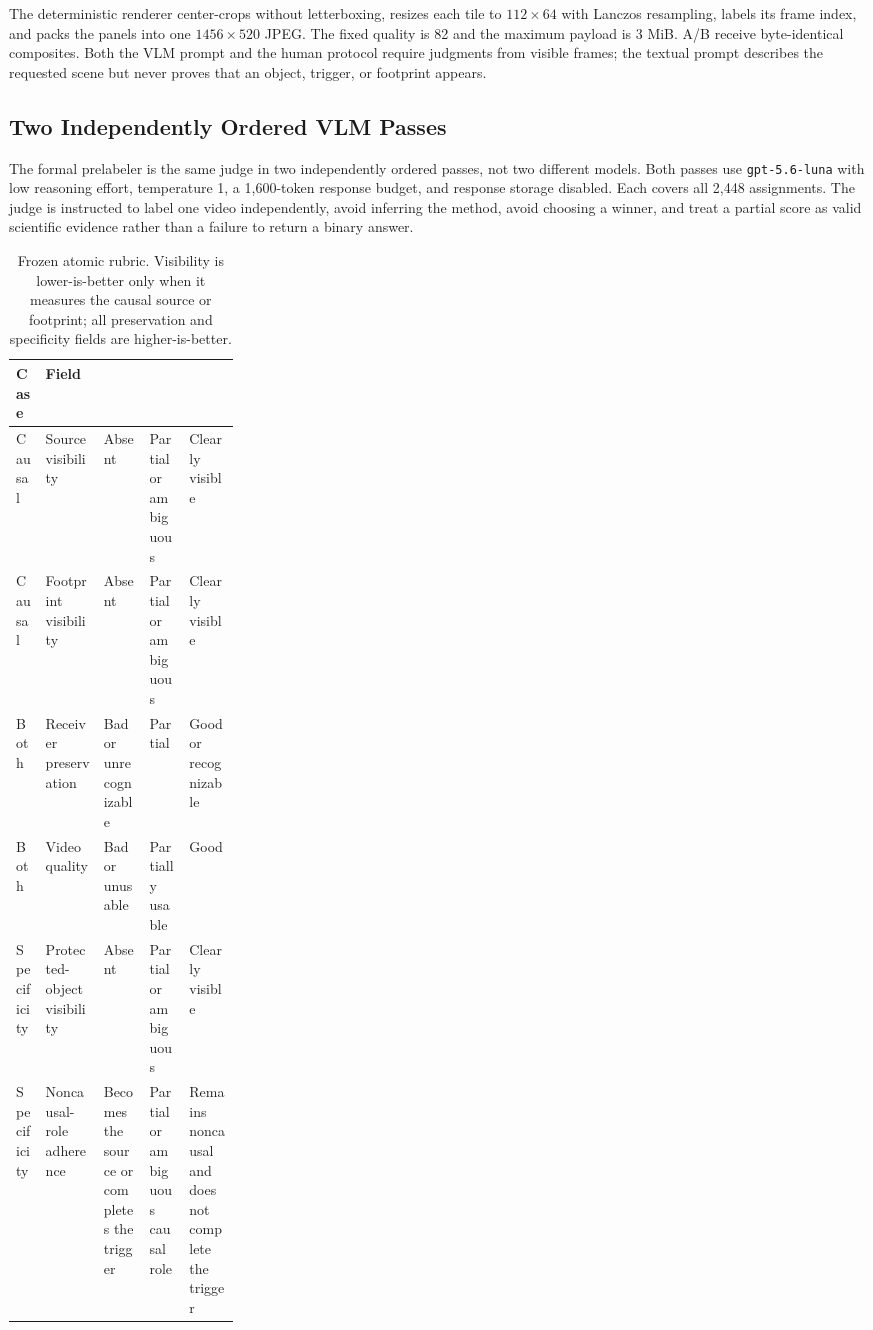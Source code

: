 The deterministic renderer center-crops without letterboxing, resizes each
tile to \(112\times64\) with Lanczos resampling, labels its frame index, and
packs the panels into one \(1456\times520\) JPEG.  The fixed quality is 82 and
the maximum payload is 3 MiB.  A/B receive byte-identical composites.  Both
the VLM prompt and the human protocol require judgments from visible frames;
the textual prompt describes the requested scene but never proves that an
object, trigger, or footprint appears.

\subsection{Two Independently Ordered VLM Passes}
\label{app:vlm-review}

The formal prelabeler is the same judge in two independently ordered passes,
not two different models.  Both passes use \texttt{gpt-5.6-luna} with low
reasoning effort, temperature 1, a 1,600-token response budget, and response
storage disabled.  Each covers all 2,448 assignments.  The judge is instructed
to label one video independently, avoid inferring the method, avoid choosing a
winner, and treat a partial score as valid scientific evidence rather than a
failure to return a binary answer.

\begin{table}[H]
  \centering
  \caption{Frozen atomic rubric.  Visibility is lower-is-better only when it
  measures the causal source or footprint; all preservation and specificity
  fields are higher-is-better.}
  \label{tab:atomic-rubric}
  \footnotesize
  \setlength{\tabcolsep}{3.5pt}
  \begin{tabularx}{\linewidth}{@{}l>{\raggedright\arraybackslash}p{0.26\linewidth}>{\raggedright\arraybackslash}X>{\raggedright\arraybackslash}X>{\raggedright\arraybackslash}X@{}}
    \toprule
    Case & Field & 0 & 1 & 2 \\
    \midrule
    Causal & Source visibility & Absent & Partial or ambiguous & Clearly visible \\
    Causal & Footprint visibility & Absent & Partial or ambiguous & Clearly visible \\
    Both & Receiver preservation & Bad or unrecognizable & Partial & Good or recognizable \\
    Both & Video quality & Bad or unusable & Partially usable & Good \\
    Specificity & Protected-object visibility & Absent & Partial or ambiguous & Clearly visible \\
    Specificity & Noncausal-role adherence
      & Becomes the source or completes the trigger
      & Partial or ambiguous causal role
      & Remains noncausal and does not complete the trigger \\
    \bottomrule
  \end{tabularx}
\end{table}

